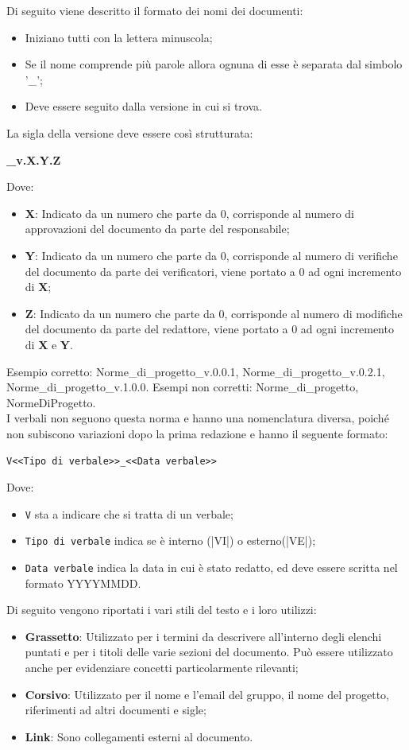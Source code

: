 Di seguito viene descritto il formato dei nomi dei documenti:
\begin{itemize}
\item Iniziano tutti con la lettera minuscola;
\item Se il nome comprende più parole allora ognuna di esse è separata dal simbolo '\_';
\item Deve essere seguito dalla versione in cui si trova.
\end{itemize}
La sigla della versione deve essere così strutturata:
\begin{center}
    \large{\textbf{\_v.X.Y.Z}}
\end{center}
Dove:
\begin{itemize}
\item \textbf{X}: Indicato da un numero che parte da 0, corrisponde al numero di approvazioni del documento da parte del responsabile;
\item \textbf{Y}: Indicato da un numero che parte da 0, corrisponde al numero di verifiche del documento da parte dei verificatori, viene portato a 0 ad ogni incremento di \textbf{X};
\item \textbf{Z}: Indicato da un numero che parte da 0, corrisponde al numero di modifiche del documento da parte del redattore, viene portato a 0 ad ogni incremento di \textbf{X} e \textbf{Y}.
\end{itemize}
Esempio corretto: Norme\_di\_progetto\_v.0.0.1, Norme\_di\_progetto\_v.0.2.1, Norme\_di\_progetto\_v.1.0.0.
Esempi non corretti: Norme\_di\_progetto, NormeDiProgetto.\\
I verbali non seguono questa norma e hanno una nomenclatura diversa, poiché non subiscono variazioni dopo la prima redazione e hanno il seguente formato: 
\begin{center}
	\verb|V<<Tipo di verbale>>_<<Data verbale>>|
\end{center}
Dove:
\begin{itemize}
	\item \verb|V| sta a indicare che si tratta di un verbale;
	\item \verb|Tipo di verbale| indica se è interno (|VI|) o esterno(|VE|);
	\item \verb|Data verbale| indica la data in cui è stato redatto, ed deve essere scritta nel formato YYYYMMDD.
\end{itemize}

Di seguito vengono riportati i vari stili del testo e i loro utilizzi:
\begin{itemize}
\item \textbf{Grassetto}: Utilizzato per i termini da descrivere all'interno degli elenchi puntati e per i titoli delle varie sezioni del documento. Può essere utilizzato anche per evidenziare concetti particolarmente rilevanti;
\item \textbf{Corsivo}: Utilizzato per il nome e l'email del gruppo, il nome del progetto, riferimenti ad altri documenti e sigle;
\item \textbf{Link}: Sono collegamenti esterni al documento.
\end{itemize}

